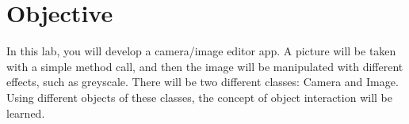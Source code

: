 \section{Objective}

In this lab, you will develop a camera/image editor app. A picture will be taken with a simple method call, and then the image will be manipulated with different effects, such as greyscale. There will be two different classes: Camera and Image. Using different objects of these classes, the concept of object interaction will be learned.
